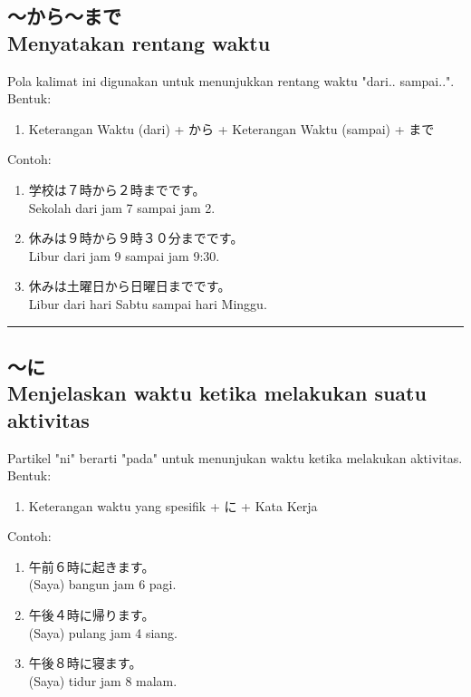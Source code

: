 \subsection*{
    ～から～まで \\
    Menyatakan rentang waktu
}
Pola kalimat ini digunakan untuk menunjukkan rentang waktu "dari.. sampai..".\\
Bentuk:
\begin{enumerate}
    \item Keterangan Waktu (dari) + から + Keterangan Waktu (sampai) + まで
\end{enumerate}
Contoh: 
\begin{enumerate}
    \item 学校は７時から２時までです。
    \\ Sekolah dari jam 7 sampai jam 2.
    \item 休みは９時から９時３０分までです。
    \\ Libur dari jam 9 sampai jam 9:30.
    \item 休みは土曜日から日曜日までです。
    \\ Libur dari hari Sabtu sampai hari Minggu.
\end{enumerate}

\vspace{0.2cm}\hrule height 1pt\vspace{0.2cm}

\newpage
\subsection*{
    ～に \\
    Menjelaskan waktu ketika melakukan suatu aktivitas
}
Partikel "ni" berarti "pada" untuk menunjukan waktu ketika 
melakukan aktivitas.\\
Bentuk:
\begin{enumerate}
    \item Keterangan waktu yang spesifik + に + Kata Kerja
\end{enumerate}
Contoh: 
\begin{enumerate}
    \item 午前６時に起きます。
    \\ (Saya) bangun jam 6 pagi.
    \item 午後４時に帰ります。
    \\ (Saya) pulang jam 4 siang.
    \item 午後８時に寝ます。
    \\ (Saya) tidur jam 8 malam.
\end{enumerate}

